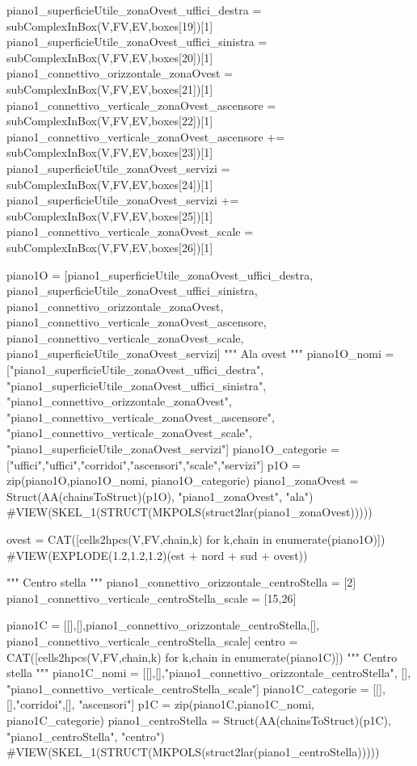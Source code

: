 piano1_superficieUtile_zonaOvest_uffici_destra = subComplexInBox(V,FV,EV,boxes[19])[1]
piano1_superficieUtile_zonaOvest_uffici_sinistra = subComplexInBox(V,FV,EV,boxes[20])[1]
piano1_connettivo_orizzontale_zonaOvest = subComplexInBox(V,FV,EV,boxes[21])[1]
piano1_connettivo_verticale_zonaOvest_ascensore = subComplexInBox(V,FV,EV,boxes[22])[1]
piano1_connettivo_verticale_zonaOvest_ascensore += subComplexInBox(V,FV,EV,boxes[23])[1]
piano1_superficieUtile_zonaOvest_servizi = subComplexInBox(V,FV,EV,boxes[24])[1]
piano1_superficieUtile_zonaOvest_servizi += subComplexInBox(V,FV,EV,boxes[25])[1]
piano1_connettivo_verticale_zonaOvest_scale = subComplexInBox(V,FV,EV,boxes[26])[1]

piano1O = [piano1_superficieUtile_zonaOvest_uffici_destra, piano1_superficieUtile_zonaOvest_uffici_sinistra, piano1_connettivo_orizzontale_zonaOvest, piano1_connettivo_verticale_zonaOvest_ascensore, piano1_connettivo_verticale_zonaOvest_scale, piano1_superficieUtile_zonaOvest_servizi]
""" Ala ovest """
piano1O_nomi = ["piano1_superficieUtile_zonaOvest_uffici_destra", "piano1_superficieUtile_zonaOvest_uffici_sinistra", "piano1_connettivo_orizzontale_zonaOvest", "piano1_connettivo_verticale_zonaOvest_ascensore", "piano1_connettivo_verticale_zonaOvest_scale", "piano1_superficieUtile_zonaOvest_servizi"]
piano1O_categorie = ["uffici","uffici","corridoi","ascensori","scale","servizi"]
p1O = zip(piano1O,piano1O_nomi, piano1O_categorie)
piano1_zonaOvest = Struct(AA(chainsToStruct)(p1O), "piano1_zonaOvest", "ala")
#VIEW(SKEL_1(STRUCT(MKPOLS(struct2lar(piano1_zonaOvest)))))
    
ovest = CAT([cells2hpcs(V,FV,chain,k) for k,chain in enumerate(piano1O)])
#VIEW(EXPLODE(1.2,1.2,1.2)(est + nord + sud + ovest))

""" Centro stella """
piano1_connettivo_orizzontale_centroStella = [2]
piano1_connettivo_verticale_centroStella_scale = [15,26]

piano1C = [[],[],piano1_connettivo_orizzontale_centroStella,[], piano1_connettivo_verticale_centroStella_scale]
centro = CAT([cells2hpcs(V,FV,chain,k) for k,chain in enumerate(piano1C)])
""" Centro stella """
piano1C_nomi = [[],[],"piano1_connettivo_orizzontale_centroStella", [], "piano1_connettivo_verticale_centroStella_scale"]
piano1C_categorie = [[],[],"corridoi",[], "ascensori"]
p1C = zip(piano1C,piano1C_nomi, piano1C_categorie)
piano1_centroStella = Struct(AA(chainsToStruct)(p1C), "piano1_centroStella", "centro")
#VIEW(SKEL_1(STRUCT(MKPOLS(struct2lar(piano1_centroStella)))))

